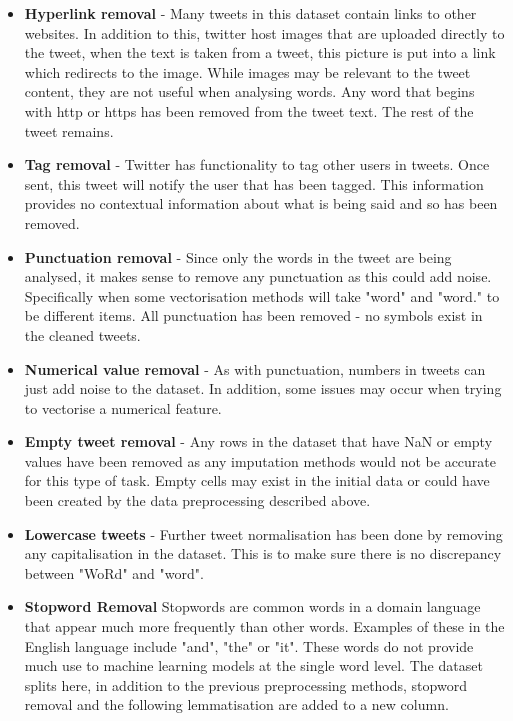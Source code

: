 \documentclass[conference]{IEEEtran}
\begin{document}
\begin{itemize}
  \item \textbf{Hyperlink removal} - Many tweets in this dataset contain links to other websites. In addition to this, twitter host images that are uploaded directly to the tweet, when the text is taken from a tweet, this picture is put into a link which redirects to the image. While images may be relevant to the tweet content, they are not useful when analysing words. Any word that begins with http or https has been removed from the tweet text. The rest of the tweet remains.
  
  \item \textbf{Tag removal} - Twitter has functionality to tag other users in tweets. Once sent, this tweet will notify the user that has been tagged. This information provides no contextual information about what is being said and so has been removed.
  
  \item \textbf{Punctuation removal} - Since only the words in the tweet are being analysed, it makes sense to remove any punctuation as this could add noise. Specifically when some vectorisation methods will take "word" and "word." to be different items. All punctuation has been removed - no symbols exist in the cleaned tweets.
  
  \item \textbf{Numerical value removal} - As with punctuation, numbers in tweets can just add noise to the dataset. In addition, some issues may occur when trying to vectorise a numerical feature.
  
  \item \textbf{Empty tweet removal} - Any rows in the dataset that have NaN or empty values have been removed as any imputation methods would not be accurate for this type of task. Empty cells may exist in the initial data or could have been created by the data preprocessing described above. 
  
  \item \textbf{Lowercase tweets} - Further tweet normalisation has been done by removing any capitalisation in the dataset. This is to make sure there is no discrepancy between "WoRd" and "word".
  
  \item \textbf{Stopword Removal} Stopwords are common words in a domain language that appear much more frequently than other words. Examples of these in the English language include "and", "the" or "it". These words do not provide much use to machine learning models at the single word level. The dataset splits here, in addition to the previous preprocessing methods, stopword removal and the following lemmatisation are added to a new column.
 

\end{itemize}
\end{document}
